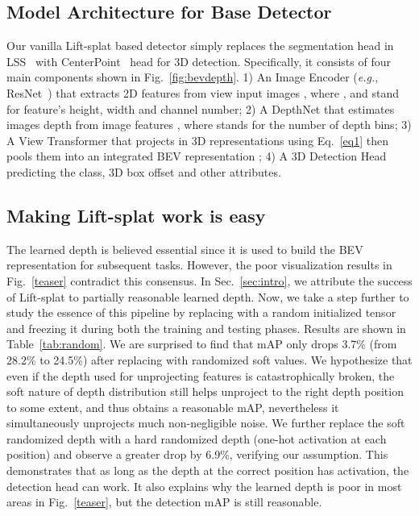 \documentclass[twocolumn,letterpaper]{article}
\begin{document}
\subsection{Model Architecture for Base Detector} Our vanilla Lift-splat based detector simply replaces the segmentation head in LSS~\cite{philion2020lift} with CenterPoint~\cite{yin2021center} head for 3D detection. Specifically, it consists of four main components shown in Fig.~\ref{fig:bevdepth}. 1) An Image Encoder (\emph{e.g.}, ResNet~\cite{resnet}) that extracts 2D features  from  view input images , where ,  and  stand for feature's height, width and channel number; 2) A DepthNet that estimates images depth  from image features , where  stands for the number of depth bins; 3) A View Transformer that projects  in 3D representations  using Eq.~\ref{eq1} then pools them into an integrated BEV representation ; 4) A 3D Detection Head predicting the class, 3D box offset and other attributes.



\subsection{Making Lift-splat work is easy} 

The learned depth  is believed essential since it is used to build the BEV representation for subsequent tasks. However, the poor visualization results in Fig.~\ref{teaser} contradict this consensus. In Sec.~\ref{sec:intro}, we attribute the success of Lift-splat to partially reasonable learned depth. Now, we take a step further to study the essence of this pipeline by replacing  with a random initialized tensor and freezing it during both the training and testing phases. Results are shown in Table~\ref{tab:random}. We are surprised to find that mAP only drops 3.7\% (from 28.2\% to 24.5\%) after replacing  with randomized soft values. We hypothesize that even if the depth used for unprojecting features is catastrophically broken, the soft nature of depth distribution still helps unproject to the right depth position to some extent, and thus obtains a reasonable mAP, nevertheless it simultaneously unprojects much non-negligible
noise. We further replace the soft randomized depth with a hard randomized depth (one-hot activation at each position) and observe a greater drop by 6.9\%, verifying our assumption. This demonstrates that as long as the depth at the correct position has activation, the detection head can work. It also explains why the learned depth is poor in most areas in Fig.~\ref{teaser}, but the detection mAP is still reasonable. 
\end{document}
